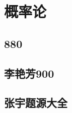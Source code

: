 \documentclass[12pt, a4paper, oneside, UTF8]{ctexbook}
\begin{document}
% 
\else
\fi
\chapter{概率论}

\section{880}

\section{李艳芳900}

\section{张宇题源大全}

\ifx\allfiles\undefined
\end{document}
